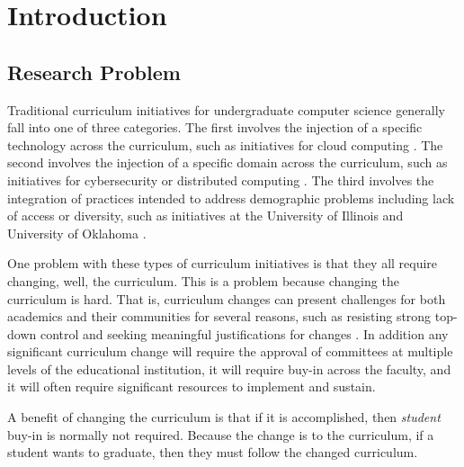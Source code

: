 \documentclass[acmsmall,nonacm]{acmart}
\begin{document}


\maketitle

\section{Introduction}

\subsection{Research Problem}

Traditional curriculum initiatives for undergraduate computer science generally fall into one of three categories. The first involves the injection of a specific technology across the curriculum, such as initiatives for cloud computing \cite{deb_module-based_2019}. The second involves the injection of a specific domain across the curriculum, such as initiatives for cybersecurity \cite{tang_shaping_2019} or distributed computing \cite{abebe_watdfs:_2019}. The third involves the integration of practices intended to address demographic problems including lack of access or diversity, such as initiatives at the University of Illinois \cite{metcalf_diversity_2018} and University of Oklahoma \cite{collain_you_2019}.

One problem with these types of curriculum initiatives is that they all require changing, well, the curriculum.  This is a problem because changing the curriculum is hard. That is, curriculum changes can present challenges for both academics and their communities for several reasons, such as resisting strong top-down control and seeking meaningful justifications for changes \cite{annala_understanding_2021}. In addition any significant curriculum change will require the approval of committees at multiple levels of the educational institution, it will require buy-in across the faculty, and it will often require significant resources to implement and sustain.

A benefit of changing the curriculum is that if it is accomplished, then {\em student} buy-in is normally not required. Because the change is to the curriculum, if a student wants to graduate, then they must follow the changed curriculum.
\end{document}
